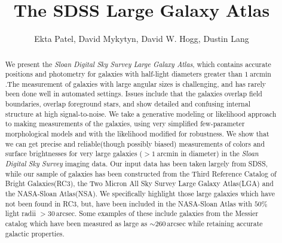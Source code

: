 \documentclass[12pt,preprint,pdftex]{aastex}
\newcounter{address}
\newcommand{\project}[1]{\textsl{#1}}
\newcommand{\units}[1]{\mathrm{#1}}
\renewcommand{\arcmin}{\units{arcmin}}
\renewcommand{\arcsec}{\units{arcsec}}
\begin{document}
\title{
       The SDSS Large Galaxy Atlas
      }
\author{
        Ekta Patel\altaffilmark{\ref{CCPP}},
        David Mykytyn\altaffilmark{\ref{CCPP}},
        David W. Hogg\altaffilmark{\ref{CCPP},\ref{MPIA},\ref{email}},
        Dustin Lang\altaffilmark{\ref{CMU}}
       }
\setcounter{address}{1}

\begin{abstract}
We present the \project{Sloan Digital Sky Survey Large Galaxy Atlas},
which contains accurate positions and photometry for galaxies with
half-light diameters greater than $1~\arcmin$.The measurement of
galaxies with large angular sizes is challenging, and has rarely been
done well in automated settings.  Issues include that the galaxies
overlap field boundaries, overlap foreground stars, and show detailed
and confusing internal structure at high signal-to-noise.  We take a
generative modeling or likelihood approach to making measurements of
the galaxies, using very simplified few-parameter morphological models
and with the likelihood modified for robustness.  We show that we can
get precise and reliable(though possibly biased) measurements of
colors and surface brightnesses for very large galaxies ($>1~\arcmin$
in diameter) in the \project{Sloan Digital Sky Survey} imaging
data. Our input data has been taken largely from SDSS, while our sample
of galaxies has been constructed from the Third Reference Catalog of
Bright Galaxies(RC3), the Two Micron All Sky Survey Large Galaxy Atlas(LGA)
and the NASA-Sloan Atlas(NSA). We specifically highlight those large
galaxies which have not been found in RC3, but, have been included in
the NASA-Sloan Atlas with $50\%$ light radii $> 30\,\arcsec$. Some
examples of these include galaxies from the Messier catalog which have
been measured as large as $\sim 260\,\arcsec$ while retaining accurate
galactic properties. 
\end{abstract}
\end{document}
